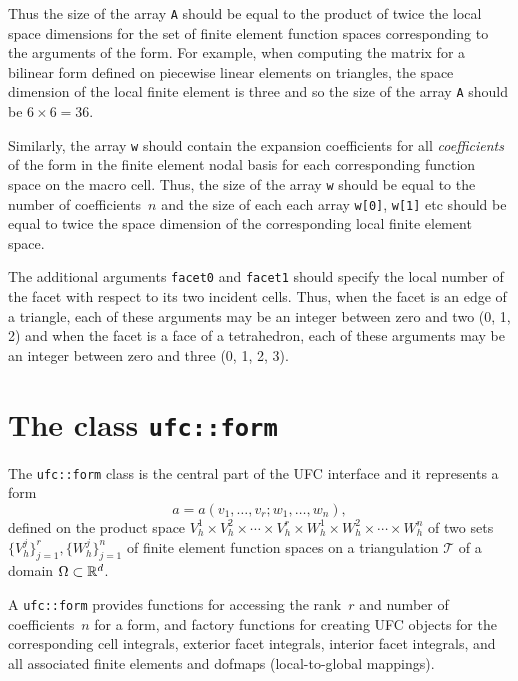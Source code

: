 Thus the size of the array \texttt{A} should be equal to the product
of twice the local space dimensions for the set of finite element
function spaces corresponding to the arguments of the form. For
example, when computing the matrix for a bilinear form defined on
piecewise linear elements on triangles, the space dimension of the
local finite element is three and so the size of the array \texttt{A}
should be $6 \times 6 = 36$.

Similarly, the array \texttt{w} should contain the expansion
coefficients for all \emph{coefficients} of the form in the finite
element nodal basis for each corresponding function space on the macro
cell. Thus, the size of the array \texttt{w} should be equal to the
number of coefficients~$n$ and the size of each each array
\texttt{w[0]}, \texttt{w[1]} etc should be equal to twice the space
dimension of the corresponding local finite element space.

The additional arguments \texttt{facet0} and \texttt{facet1} should
specify the local number of the facet with respect to its two incident
cells. Thus, when the facet is an edge of a triangle, each of these
arguments may be an integer between zero and two (0, 1, 2) and when
the facet is a face of a tetrahedron, each of these arguments may be
an integer between zero and three (0, 1, 2, 3).

\section{The class \texttt{ufc::form}}

The \texttt{ufc::form} class is the central part of the UFC interface
and it represents a form
\begin{equation}
  a = a(v_1, \ldots, v_r; w_1, \ldots, w_n), 
\end{equation}
defined on the product space $V_h^1 \times V_h^2 \times \cdots \times
V_h^r \times W_h^1 \times W_h^2 \times \cdots \times W_h^n$ of two
sets $\{V_h^j\}_{j=1}^r, \{W_h^j\}_{j=1}^n$ of finite element function
spaces on a triangulation $\mathcal{T}$ of a domain $\Omega \subset
\mathbb{R}^d$.

A \texttt{ufc::form} provides functions for accessing the rank~$r$ and
number of coefficients~$n$ for a form, and factory functions for
creating UFC objects for the corresponding cell integrals, exterior
facet integrals, interior facet integrals, and all associated finite
elements and dofmaps (local-to-global mappings).

